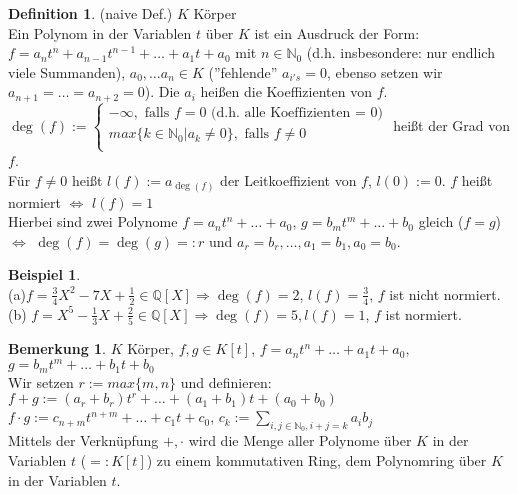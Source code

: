 \documentclass[10pt,a4paper,numbers=endperiod]{scrartcl}
\theoremstyle{definition}
\newtheorem{defi}[satz]{Definition}
\newtheorem{bem}[satz]{Bemerkung}
\newtheorem{bsp}[satz]{Beispiel}
\begin{document}
\begin{defi}
	(naive Def.) $K$ Körper\\
	Ein Polynom in der Variablen $t$ über $K$ ist ein Ausdruck der Form:\\
	$f=a_nt^n+a_{n-1}t^{n-1}+ \dots +a_1t+a_0$ mit $n \in \mathbb{N}_0$ (d.h. insbesondere: nur endlich viele Summanden), $a_0, \dots a_n \in K$ (''fehlende'' $a_{i's}=0$, ebenso setzen wir $a_{n+1} = \dots = a_{n+2} =0$). Die $a_i$ heißen die Koeffizienten von $f$.\\
	 $\deg(f) := \begin{cases}
	-\infty, \text{ falls } f=0 \text{ (d.h. alle Koeffizienten = 0)}\\
	max\{k \in \mathbb{N}_0|a_k \neq 0\}, \text{ falls } f\neq 0\\
	\end{cases}$
	heißt der Grad von $f$.\\
	Für $f\neq 0 $ heißt $l(f) := a_{\deg(f)}$ der Leitkoeffizient von $f$, $l(0) := 0$. $f$ heißt normiert $\Leftrightarrow$ $l(f) = 1$	\\
	Hierbei sind zwei Polynome $f=a_nt^n+ \dots +a_0$, $g=b_mt^m+ \dots +b_0$ gleich ($f=g$)\\ $\Leftrightarrow$ $\deg(f)=\deg(g) =: r$ und $a_r=b_r, \dots, a_1=b_1, a_0=b_0$.
\end{defi}

\begin{bsp}
	$ $\\
	(a)$f = \frac{3}{4} X^2 -7X+ \frac{1}{2} \in \mathbb{Q}[X] \Rightarrow \deg(f) =2$, $l(f) = \frac{3}{4}$, $f$ ist nicht normiert.\\
	(b) $f = X^5 - \frac{1}{3}X+\frac{2}{5} \in \mathbb{Q}[X] \Rightarrow \deg(f) = 5, l(f) = 1$, $f$ ist normiert.
\end{bsp}

\begin{bem}
	$K$ Körper, $f,g \in K[t]$, $f =a_nt^n+ \dots +a_1t+a_0$, $g = b_mt^m+ \dots +b_1t+b_0$\\
	Wir setzen $r:=max\{m,n\}$ und definieren:\\
	$f+g := (a_r+b_r)t^r+ \dots + (a_1+ b_1)t + (a_0+b_0)$\\
	$f \cdot g := c_{n+m}t^{n+m}+ \dots + c_1t+c_0$, $c_k := \sum\limits_{i,j \in \mathbb{N}_0, i+j =k} a_ib_j$\\
	Mittels der Verknüpfung $+,\cdot$ wird die Menge aller Polynome über $K$ in der Variablen $t$ ($=: K[t]$) zu einem kommutativen Ring, dem Polynomring über $K$ in der Variablen $t$.
\end{bem}
\end{document}
